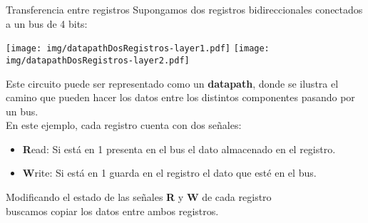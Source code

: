 \documentclass[aspectratio=169]{beamer}
\begin{document}
\begin{frame}[fragile,t]{Transferencia entre registros}
    Supongamos dos registros bidireccionales conectados a un bus de 4 bits:\\
    \begin{center}
    \texttt{[image: img/datapathDosRegistros-layer1.pdf]} \hspace{1cm}
    \pause
    \texttt{[image: img/datapathDosRegistros-layer2.pdf]}
    \end{center}
    Este circuito puede ser representado como un \textbf{datapath}, donde se ilustra el camino que pueden hacer los datos entre los distintos componentes pasando por un bus.\\
    \bigskip
    \pause
    En este ejemplo, cada registro cuenta con dos señales:\\
    \begin{itemize}
    \setlength\itemsep{0cm}
    \item \normalsize \textbf{R}ead: {\small Si está en 1 presenta en el bus el dato almacenado en el registro.}\\
    \item \normalsize \textbf{W}rite: {\small Si está en 1 guarda en el registro el dato que esté en el bus.}\\
    \end{itemize}
    \begin{center}
    \textcolor{verdeuca}{Modificando el estado de las señales \textbf{R} y \textbf{W} de cada registro\\ buscamos copiar los datos entre ambos registros.}
    \end{center}
\end{frame}
\end{document}

